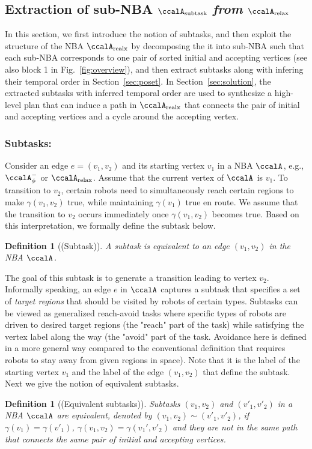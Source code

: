 \documentclass[Afour,sageh,times]{sagej}
\newtheorem{defn}[thm]{Definition}
\newcommand{\auto}[1]{\ccalA_{\textup{#1}}}
\newcommand{\autop}{\ccalA_{\phi}}
\begin{document}
{  \subsection{Extraction of sub-NBA \upshape  $\auto{subtask}$ {\it from} $\auto{relax}$}\label{sec:pregraph}
  In  this section, we first introduce the notion of subtasks, and then exploit the structure of the NBA $\auto{realx}$ by decomposing the it into sub-NBA such that each sub-NBA corresponds to one pair of sorted initial and accepting vertices (see also block 1 in Fig.~\ref{fig:overview}), and then extract subtasks along with infering  their temporal order  in  Section~\ref{sec:poset}. In Section~\ref{sec:solution}, the extracted subtasks with inferred temporal order are used to synthesize a high-level plan that can induce a path in $\auto{realx}$ that connects the   pair of initial and accepting vertices and a cycle around the accepting vertex.
\subsubsection{Subtasks:}\label{sec:subtask}
Consider an edge $e = (v_1, v_2) $  and its starting vertex $v_1$ in a NBA $\auto{}$, e.g., $\autop^-$ or $\auto{relax}$.  Assume that the current vertex of $\auto{}$ is $v_1$. To transition to $v_2$, certain robots need to simultaneously reach certain regions to make $\gamma(v_1, v_2)$ true, while maintaining  $\gamma(v_1)$ true en route. We assume that the transition to $v_2$ occurs immediately once $\gamma(v_1, v_2)$ becomes true. Based on this interpretation, we formally define the subtask below.
\begin{defn}[(Subtask)]\label{defn:subtask}
 {A subtask is equivalent to an edge $(v_1, v_2)$ in the NBA $\auto{}$.}
\end{defn}

The goal of this subtask is to generate a transition leading to vertex $v_2$. Informally speaking, an edge $e$ in $\auto{}$ captures a subtask that specifies a set of \textit{target regions} that should be visited by robots of certain types. Subtasks can be viewed as generalized reach-avoid tasks where  specific types of robots are driven to desired target regions (the "reach" part of the task) while satisfying the vertex label along the way (the "avoid" part of the task. Avoidance here is defined in a more general way compared to the conventional definition that requires robots to stay away from given regions in space). Note that it is the label of the starting vertex $v_1$ and the label of the edge $(v_1, v_2)$ that define the subtask.
Next we give  the notion of equivalent subtasks.
\begin{defn}[(Equivalent subtasks)]\label{defn:eq}
 Subtasks $(v_1, v_2)$ and $(v'_1, v'_2)$ in a NBA $\auto{}$ are equivalent, denoted by $(v_1, v_2) \sim (v'_1, v'_2)$, if $\gamma(v_1) = \gamma(v'_1)$, $\gamma(v_1, v_2)=\gamma(v_1', v'_2)$ and they  are not in the same path that connects the same  pair of initial and accepting vertices.
\end{defn}

}
\end{document}
